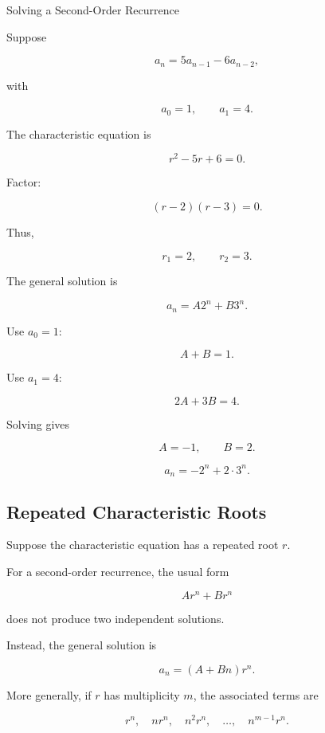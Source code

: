 \begin{workedexamplebox}{Solving a Second-Order Recurrence}

Suppose

\[
a_n
=
5a_{n-1}
-
6a_{n-2},
\]

with

\[
a_0=1,
\qquad
a_1=4.
\]

The characteristic equation is

\[
r^2-5r+6=0.
\]

Factor:

\[
(r-2)(r-3)=0.
\]

Thus,

\[
r_1=2,
\qquad
r_2=3.
\]

The general solution is

\[
a_n=A2^n+B3^n.
\]

Use \(a_0=1\):

\[
A+B=1.
\]

Use \(a_1=4\):

\[
2A+3B=4.
\]

Solving gives

\[
A=-1,
\qquad
B=2.
\]

\begin{answerbox}
\[
\boxed{
a_n
=
-2^n+2\cdot3^n.
}
\]
\end{answerbox}

\end{workedexamplebox}

\subsection{Repeated Characteristic Roots}
\label{subsec:repeated-characteristic-roots}

Suppose the characteristic equation has a repeated root \(r\).

For a second-order recurrence, the usual form

\[
A r^n+B r^n
\]

does not produce two independent solutions.

Instead, the general solution is

\[
\boxed{
a_n
=
(A+Bn)r^n.
}
\]

More generally, if \(r\) has multiplicity \(m\), the associated terms
are

\[
\boxed{
r^n,
\quad
nr^n,
\quad
n^2r^n,
\quad
\ldots,
\quad
n^{m-1}r^n.
}
\]

